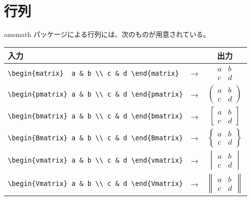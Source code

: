 \section{行列}
amsmath パッケージによる行列には、次のものが用意されている。
\begin{longtable}[c]{@{}lcc@{}}
  入力                                                &    & 出力                                           \\ \toprule
  \verb`\begin{matrix}  a & b \\ c & d \end{matrix}`  & → & $\begin{matrix}  a & b \\ c & d \end{matrix}$  \\[+15.0pt]
  \verb`\begin{pmatrix} a & b \\ c & d \end{pmatrix}` & → & $\begin{pmatrix} a & b \\ c & d \end{pmatrix}$ \\[+15.0pt]
  \verb`\begin{bmatrix} a & b \\ c & d \end{bmatrix}` & → & $\begin{bmatrix} a & b \\ c & d \end{bmatrix}$ \\[+15.0pt]
  \verb`\begin{Bmatrix} a & b \\ c & d \end{Bmatrix}` & → & $\begin{Bmatrix} a & b \\ c & d \end{Bmatrix}$ \\[+15.0pt]
  \verb`\begin{vmatrix} a & b \\ c & d \end{vmatrix}` & → & $\begin{vmatrix} a & b \\ c & d \end{vmatrix}$ \\[+15.0pt]
  \verb`\begin{Vmatrix} a & b \\ c & d \end{Vmatrix}` & → & $\begin{Vmatrix} a & b \\ c & d \end{Vmatrix}$ \\[+15.0pt]
\end{longtable}

